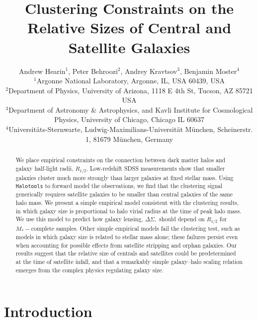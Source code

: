 \documentclass[usenatbib,usegraphicx,letterpaper]{mn2e}
\newcommand{\rhalf}{R_{1/2}}
\newcommand{\mstar}{M_{\ast}}
\begin{document}
\title[The Relative Sizes of Centrals and Satellites]
{Clustering Constraints on the Relative Sizes of Central and Satellite Galaxies}


\author[Hearin, Behroozi, Kravtsov \& Moster]{
Andrew Hearin$^{1}$, Peter Behroozi$^{2}$, Andrey Kravtsov$^{3}$, Benjamin Moster$^{4}$\\
$^{1}$Argonne National Laboratory, Argonne, IL, USA 60439, USA\\
$^{2}$Department of Physics, University of Arizona, 1118 E 4th St, Tucson, AZ 85721 USA\\
$^{3}$Department of Astronomy \& Astrophysics, and Kavli Institute for Cosmological Physics, University of Chicago, Chicago IL 60637\\
$^{4}$Universit{\"a}ts-Sternwarte, Ludwig-Maximilians-Universit{\"a}t M{\"u}nchen, Scheinerstr. 1, 81679 M{\"u}nchen, Germany
}

\maketitle

\begin{abstract}
We place empirical constraints on the connection between dark matter halos and galaxy half-light radii, $\rhalf.$ Low-redshift SDSS measurements show that smaller galaxies cluster much more strongly than larger galaxies at fixed stellar mass. Using {\tt Halotools} to forward model the observations, we find that the clustering signal generically requires satellite galaxies to be smaller than central galaxies of the same halo mass. We present a simple empirical model consistent with the clustering results, in which galaxy size is proportional to halo virial radius at the time of peak halo mass. We use this model to predict how galaxy lensing, $\Delta\Sigma,$ should depend on $\rhalf$ for $\mstar-$complete samples. Other simple empirical models fail the clustering test, such as models in which galaxy size is related to stellar mass alone; these failures persist even when accounting for possible effects from satellite stripping and orphan galaxies. Our results suggest that the relative size of centrals and satellites could be predetermined at the time of satellite infall, and that a remarkably simple galaxy--halo scaling relation emerges from the complex physics regulating galaxy size.
\end{abstract}

\section{Introduction}
\label{sec:intro}
\end{document}
